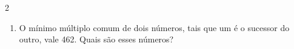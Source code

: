 \documentclass[a4paper,14pt]{article}
\begin{document}
\begin{multicols}{2}
\begin{enumerate}
\begin{enumerate}[a)]
				\item $\frac{8a}{8b}$ \\\\\\\\\\\\\\
				\item $\frac{a + a + a}{b + b + b}$ \\\\\\\\\\\\\\
				\item $\frac{a - 2}{b - 2}$ \\\\\\\\\\\\
				\item $\frac{a \cdot a}{b \cdot b}$ \\\\\\\\\\\\\\\\\\
			\end{enumerate}
			\item O mínimo múltiplo comum de dois números, tais que um é o sucessor do outro, vale 462. Quais são esses números? \\\\\\\\\\\\\\\\\\\\\\\\\\\\\\\\\\\\\\\\\\\\\\\\\\\\

\end{enumerate}
\end{multicols}
\end{document}
